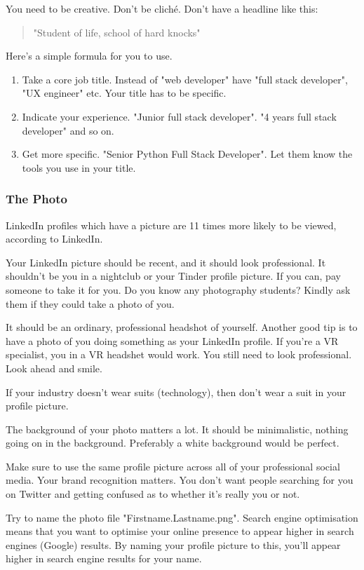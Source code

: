 \documentclass{article}
\begin{document}
You need to be creative. Don't be cliché. Don't have a headline like
this:

\begin{quote}"Student of life, school of hard knocks"\end{quote}

Here's a simple formula for you to use.
\begin{enumerate}
\def\labelenumi{\arabic{enumi}.}
\item
  Take a core job title. Instead of "web developer" have "full stack
  developer", "UX engineer" etc. Your title has to be specific.
\item
  Indicate your experience. "Junior full stack developer". "4 years
  full stack developer" and so on.
\item
  Get more specific. "Senior Python Full Stack Developer". Let them
  know the tools you use in your title.
\end{enumerate}
\subsubsection{The Photo}
LinkedIn profiles which have a picture are 11 times more likely to be
viewed, according to LinkedIn.

Your LinkedIn picture should be recent, and it should look professional.
It shouldn't be you in a nightclub or your Tinder profile picture. If
you can, pay someone to take it for you. Do you know any photography
students? Kindly ask them if they could take a photo of you.

It should be an ordinary, professional headshot of yourself. Another
good tip is to have a photo of you doing something as your LinkedIn
profile. If you're a VR specialist, you in a VR headshet would work. You
still need to look professional. Look ahead and smile.

If your industry doesn't wear suits (technology), then don't wear a suit
in your profile picture.

The background of your photo matters a lot. It should be minimalistic,
nothing going on in the background. Preferably a white background would
be perfect.

Make sure to use the same profile picture across all of your
professional social media. Your brand recognition matters. You don't
want people searching for you on Twitter and getting confused as to
whether it's really you or not.

Try to name the photo file "Firstname.Lastname.png". Search engine
optimisation means that you want to optimise your online presence to
appear higher in search engines (Google) results. By naming your profile
picture to this, you'll appear higher in search engine results for your
name.
\end{document}
